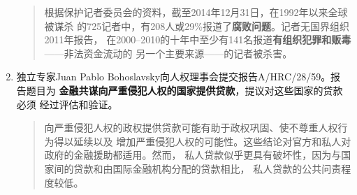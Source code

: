 \begin{enumerate}
\begin{quotation}
    根据保护记者委员会的资料，截至2014年12月31日，在1992年以来全球被谋杀
    的725记者中，有208人或29\%报道了\textbf{腐败问题}。记者无国界组织2011年报告，
    在2000--2010的十年中至少有141名报道\textbf{有组织犯罪和贩毒}——非法资金流动的
    另一个主要来源——的记者被杀害。
  \end{quotation}

\item 独立专家Juan Pablo Bohoslavsky向人权理事会提交报告A/HRC/28/59。报
  告题目为 \textbf{金融共谋向严重侵犯人权的国家提供贷款}，提议对这些国家的贷款必须
  经过评估和验证。
  \begin{quotation}
    向严重侵犯人权的政权提供贷款可能有助于政权巩固、使不尊重人权行为得以延续以及
    增加严重侵犯人权的可能性。这些结论对官方和私人对政府的金融援助都适用。然而，
    私人贷款似乎更具有破坏性，因为与国家间的贷款和由国际金融机构分配的贷款相比，
    私人贷款的公共问责程度较低。
  \end{quotation}

\end{enumerate}








